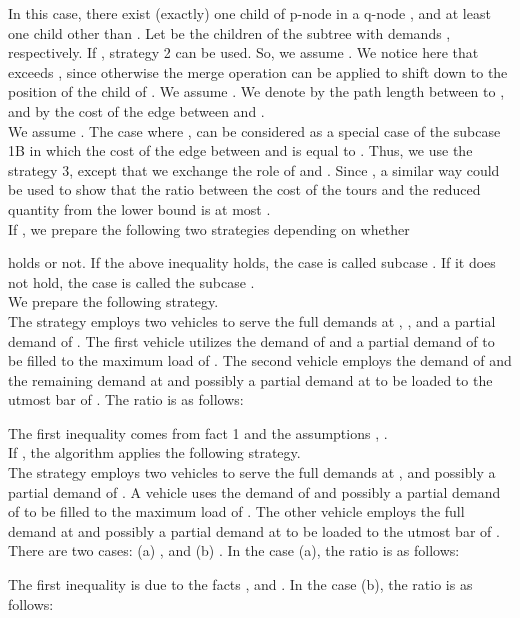 \indent  In this case, there exist (exactly) one child of p-node  in a q-node , and at least one child  other than . Let  be the children of the subtree  with demands , respectively. If , strategy 2 can be used. So, we assume . We notice here that  exceeds , since otherwise the merge operation can be applied to shift  down to the position of the child of . We assume . We denote by  the path length between  to , and by  the cost of the edge between  and .\\

\indent  We assume . The case where , can be considered as a special case of the subcase 1B in which the cost of the edge between  and  is equal to . Thus, we use the strategy 3, except that we exchange the role of  and . Since , a similar way could be used to show that the ratio between the cost of the tours and the reduced quantity from the lower bound is at most . \\
\indent If , we prepare the following two strategies depending on whether 

\noindent  holds or not. If the above inequality holds, the case is called subcase . If it does not hold, the case is called the subcase . \\

\indent  We prepare the following strategy.\\
\indent  The strategy employs two vehicles to serve the full demands at , ,  and a partial demand of . The first vehicle utilizes the demand of  and a partial demand of  to be filled to the maximum load of . The second vehicle employs the demand of  and the remaining demand at  and possibly a partial demand at  to be loaded to the utmost bar of . The ratio is as follows: 

\noindent The first inequality comes from fact 1 and the assumptions , .\\

\indent  If , the algorithm applies the following strategy. \\
\indent  The strategy employs two vehicles to serve the full demands at ,  and possibly a partial demand of . A vehicle uses the demand of  and possibly a partial demand of  to be filled to the maximum load of . The other vehicle employs the full demand at  and possibly a partial demand at  to be loaded to the utmost bar of . There are two cases: (a) , and (b) . In the case (a), the ratio is as follows:

\noindent The first inequality is due to the facts , and . In the case (b), the ratio is as follows:


